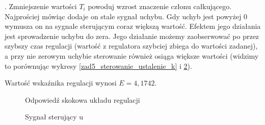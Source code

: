. Zmniejszenie wartości $T_{i}$ powoduj wzrost znaczenie członu całkującego. Najprościej mówiąc dodaje on stale sygnał uchybu. Gdy uchyb jest powyżej 0 wymusza on na sygnale sterującym coraz większą wartość. Efektem jego działania jest sprowadzenie uchybu do zera. Jego działanie możemy zaobserwować po przez szybszy czas regulacji (wartość z regulatora szybciej zbiega do wartości zadanej), a przy nie zerowym uchybie sterowanie również osiąga większe wartości (widzimy to porównując wykresy \ref{zad5_sterowanie_ustalenie_k} i \ref{zad5_sterowanie_ustalenie_ti}).
\begin{center}
Wartość wskaźnika regulacji wynosi $E=4,1742$.
\end{center}
\begin{figure}[h]
    \centering
    \caption{Odpowiedź skokowa układu regulacji}
    \label{zad5_niegasnące_oscylacje}
\end{figure}

\begin{figure}[h]
    \label{zad5_sterowanie_ustalenie_ti}
    \centering
    \caption{Sygnał sterujący u}
\end{figure}
\FloatBarrier

